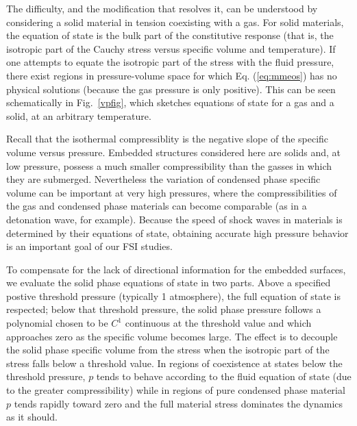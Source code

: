 The difficulty, and the modification that resolves it, can be understood by
considering a solid material in tension coexisting with a gas.  For solid
materials, the equation of state is the bulk part of the constitutive response
(that is, the isotropic part of the Cauchy stress versus specific volume and
temperature).  If one attempts to equate the isotropic part of the stress
with the fluid pressure, there exist regions in pressure-volume space for
which Eq. (\ref{eq:mmeos}) has no physical solutions (because the gas pressure
is only positive).  This can be seen schematically in Fig.~\ref{vpfig}, which
sketches equations of state for a gas and a solid, at an arbitrary temperature.

Recall that the isothermal compressiblity is the negative slope of the
specific volume versus pressure.  Embedded structures considered here are
solids and, at low pressure, possess a much smaller compressibility than
the gasses in which they are submerged.  Nevertheless the variation of
condensed phase specific volume can be important at very high pressures,
where the compressibilities of the gas and condensed phase materials can
become comparable (as in a detonation wave, for example).  Because the speed of
shock waves in materials is determined by their equations of state, obtaining
accurate high pressure behavior is an important goal of our FSI studies.

To compensate for the lack of directional information for the embedded
surfaces, we evaluate the solid phase equations of state in two parts.
Above a specified postive threshold pressure (typically 1 atmosphere),
the full equation of state is respected; below that threshold pressure, the
solid phase pressure follows a polynomial chosen to be $C^1$ continuous at the
threshold value and which approaches zero as the specific volume becomes large.
The effect is to decouple the solid phase specific volume from the stress when
the isotropic part of the stress falls below a threshold value.  In regions
of coexistence at states below the threshold pressure, $p$ tends to behave
according to the fluid equation of state (due to the greater compressibility)
while in regions of pure condensed phase material $p$ tends rapidly toward
zero and the full material stress dominates the dynamics as it should.

